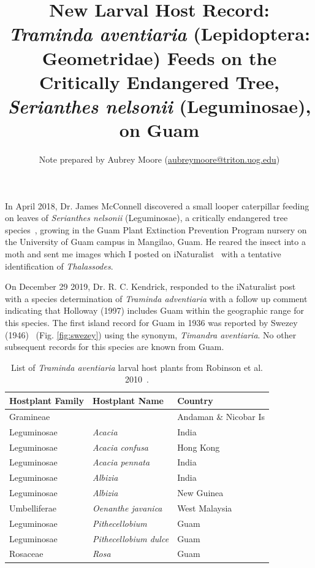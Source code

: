 \documentclass[english,letterpaper]{scrartcl}
\begin{document}
	
\title{New Larval Host Record: \textit{Traminda aventiaria} (Lepidoptera: Geometridae) Feeds on the Critically Endangered Tree, \textit{Serianthes nelsonii} (Leguminosae), on Guam}

\author{Note prepared by Aubrey Moore (\href{mailto://aubreymoore@triton.uog.edu}{aubreymoore@triton.uog.edu})}

\maketitle

In April 2018, Dr. James McConnell discovered a small looper caterpillar feeding on leaves of \textit{Serianthes nelsonii} (Leguminosae), a critically endangered tree species~\cite{Wiles2017}, growing in the Guam Plant Extinction Prevention Program nursery on the University of Guam campus in Mangilao, Guam. He reared the insect into a moth and sent me images which I posted on iNaturalist~\cite{iNat} with a tentative identification of \textit{Thalassodes}.

On December 29 2019, Dr. R. C. Kendrick, responded to the iNaturalist post with a species determination of \textit{Traminda adventiaria} with a follow up comment indicating that Holloway (1997) includes Guam within the geographic range for this species. The first island record for Guam in 1936 was reported by Swezey (1946)~\cite{Swezey1946} (Fig. \ref{fig:swezey}) using the synonym, \textit{Timandra aventiaria}. No other subsequent records for this species are known from Guam.  

\begin{table}[h]
	\centering
	\caption{List of \textit{Traminda aventiaria} larval host plants from Robinson et al. 2010~\cite{Robinson2010}.} 
    \label{tbl:hosts}
	\begin{tabular}{lll}
		\toprule
		Hostplant Family &	Hostplant Name & Country \\
		\midrule
		Gramineae &	& Andaman \& Nicobar Is \\
		Leguminosae & \textit{Acacia} & India \\
		Leguminosae & \textit{Acacia confusa} & Hong Kong \\
		Leguminosae & \textit{Acacia pennata} & India \\
		Leguminosae & \textit{Albizia} & India \\
		Leguminosae & \textit{Albizia} & New Guinea \\
		Umbelliferae & \textit{Oenanthe javanica} & West Malaysia \\
		Leguminosae & \textit{Pithecellobium} & Guam \\
		Leguminosae & \textit{Pithecellobium dulce} & Guam \\
		Rosaceae & \textit{Rosa} & Guam \\
		\bottomrule
	\end{tabular} 
\end{table}
\end{document}
